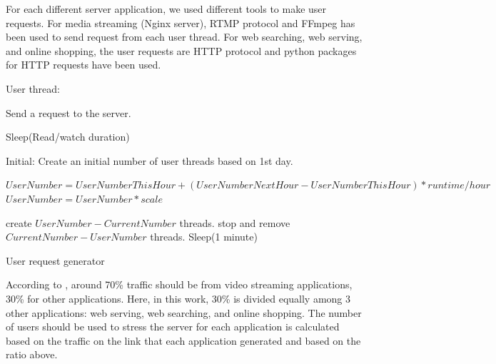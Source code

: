 \documentclass[conference]{IEEEtran}
\makeatletter
\newcommand{\removelatexerror}{\let\@latex@error\@gobble}
\makeatother
\begin{document}
For each different server application, we used different tools to make user requests. For media streaming (Nginx server), RTMP protocol and FFmpeg has been used to send request from each user thread. For web searching, web serving, and online shopping, the user requests are HTTP protocol and python packages for HTTP requests have been used.

\removelatexerror
\begin{algorithm}[]
    \DontPrintSemicolon
        
        User thread:
        {
            Send a request to the server.

            Sleep(Read/watch duration)
        }

        Initial: Create an initial number of user threads based on 1st day.

        {
            {
                {
                    $UserNumber = UserNumberThisHour + (UserNumberNext Hour - UserNumberThisHour)*runtime/hour$
                    $UserNumber = UserNumber*scale$

                    {
                        create $UserNumber - CurrentNumber$ threads.
                    }
                    \Else
                    {
                        stop and remove $CurrentNumber - UserNumber$ threads.
                    }
                    Sleep(1 minute)
                }
            }
        }
    \caption{User request generator}
    \label{algo:user-traffic-gen}
\end{algorithm}

According to \cite{5GPPP2020}, around 70\% traffic should be from video streaming applications, 30\% for other applications. Here, in this work, 30\% is divided equally among 3 other applications: web serving, web searching, and online shopping. The number of users should be used to stress the server for each application is calculated based on the traffic on the link that each application generated and based on the ratio above.
\end{document}
